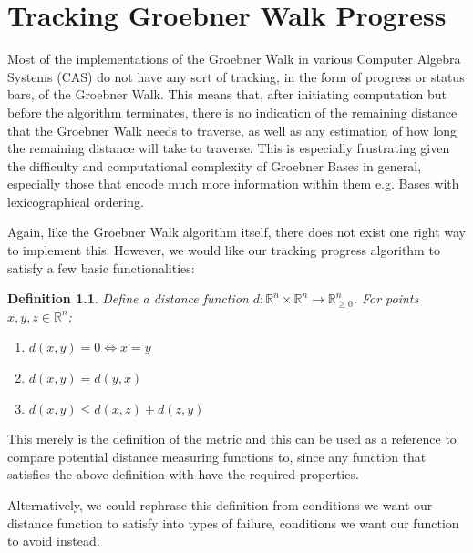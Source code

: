 \documentclass[12pt,a4paper]{report}
\newtheorem{definition}[theorem]{Definition}
\begin{document}
\chapter{Tracking Groebner Walk Progress}
Most of the implementations of the Groebner Walk in various Computer Algebra Systems (CAS) do not have any sort of tracking, in the form of progress or status bars, of the Groebner Walk. This means that, after initiating computation but before the algorithm terminates, there is no indication of the remaining distance that the Groebner Walk needs to traverse, as well as any estimation of how long the remaining distance will take to traverse. This is especially frustrating given the difficulty and computational complexity of Groebner Bases in general, especially those that encode much more information within them e.g. Bases with lexicographical ordering.

Again, like the Groebner Walk algorithm itself, there does not exist one right way to implement this. However, we would like our tracking progress algorithm to satisfy a few basic functionalities:

\begin{definition}
Define a distance function $d : \mathbb R^{n} \times \mathbb R^{n} \rightarrow \mathbb R_{\geq 0}^{n}$. For points $x, y , z \in \mathbb R^{n}$:

\begin{enumerate}
    \item $d(x,y) = 0 \Longleftrightarrow x = y$
    \item $d(x,y) = d(y,x)$
    \item $d(x,y) \leq d(x,z) + d(z,y)$
\end{enumerate}
\end{definition}

This merely is the definition of the metric and this can be used as a reference to compare potential distance measuring functions to, since any function that satisfies the above definition with have the required properties. 

Alternatively, we could rephrase this definition from conditions we want our distance function to satisfy into types of failure, conditions we want our function to avoid instead.
\end{document}
